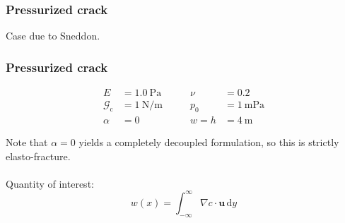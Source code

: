 \documentclass{beamer}
\begin{document}




\begin{frame}
  \frametitle{Pressurized crack}

  Case due to Sneddon.
  \begin{center}
  \end{center}
\end{frame}

\begin{frame}
  \frametitle{Pressurized crack}

  \begin{align*}
    E &= \SI{1.0}{\pascal} \qquad & \nu &= 0.2 \\
    \mathcal{G}_\text{c} &= \SI{1}{\newton\per\meter} \qquad & p_0 &= \SI{1}{\milli\pascal} \\
    \alpha &= 0 \qquad & w = h &= \SI{4}{\meter}
  \end{align*}

  Note that $\alpha=0$ yields a completely decoupled formulation, so this is
  strictly elasto-fracture. \\~\\

  Quantity of interest:
  \[
    w(x) = \int_{-\infty}^\infty \nabla c \cdot \bm u \, \text{d} y
  \]
\end{frame}
\end{document}
